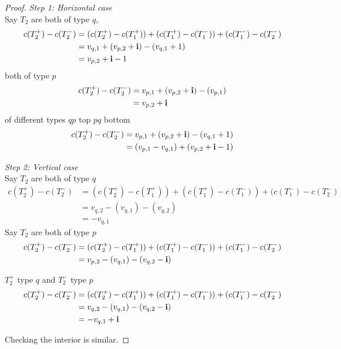 \documentclass[12pt]{amsart}
\begin{document}
\begin{proof}
	{\it Step 1: Horizontal case} \\
	Say $T_2$ are both of type $q$, 
	\begin{align*}
	c(T_2^+) - c(T_2^-) &=	(c(T_2^+) - c(T_1^+)) + (c(T_1^+) - c(T_1^-)) + (c(T_1^-) - c(T_2^-) \\
	& = v_{q,1} + (v_{p,2}+ \mathbf{i}) - (v_{q,1} + 1)  \\
	&= v_{p,2} + \mathbf{i} - 1
	\end{align*}
	both of type $p$
	\begin{align*}
	c(T_2^+) - c(T_2^-) &= v_{p,1} + (v_{p,2}+ \mathbf{i}) - (v_{p,1} ) \\
	&= v_{p,2} + \mathbf{i}
	\end{align*}
	of different types $qp$ top $pq$ bottom 
	\begin{align*}
	c(T_2^+) - c(T_2^-) &= v_{p,1} + (v_{p,2}+ \mathbf{i}) - (v_{q,1} + 1) \\
	&=  (v_{p,1} - v_{q,1}) + (v_{p,2} + \mathbf{i} - 1)
	\end{align*}
	
	{\it Step 2: Vertical case} \\
	Say $T_2$ are both of type $q$ 
	\begin{align*}
	c(T_2^+) - c(T_2^-) &=	(c(T_2^+) - c(T_1^+)) + (c(T_1^+) - c(T_1^-)) + (c(T_1^-) - c(T_2^-) \\
	& = v_{q,2} - (v_{q,1}) - (v_{q,2})  \\
	&= -v_{q,1}
	\end{align*}
	Say $T_2$ are both of type $p$ 
	\begin{align*}
	c(T_2^+) - c(T_2^-) &=	(c(T_2^+) - c(T_1^+)) + (c(T_1^+) - c(T_1^-)) + (c(T_1^-) - c(T_2^-) \\
	& = v_{p,2} - (v_{q,1}) - (v_{q,2}-\mathbf{i})  \\
	\end{align*}
	
	$T_2^+$ type $q$ and $T_2^-$ type $p$
	\begin{align*}
	c(T_2^+) - c(T_2^-) &=	(c(T_2^+) - c(T_1^+)) + (c(T_1^+) - c(T_1^-)) + (c(T_1^-) - c(T_2^-) \\
	& = v_{q,2} - (v_{q,1}) - (v_{q,2}-\mathbf{i})  \\
	&= -v_{q,1} + \mathbf{i}
	\end{align*}
	
	Checking the interior is similar. 
\end{proof}


\fi

\end{document}
